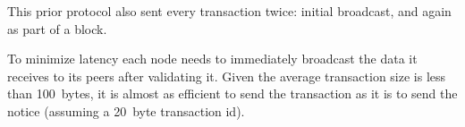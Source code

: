 This prior protocol also sent every transaction twice: initial broadcast, and
again as part of a block. 

To minimize latency each node needs to immediately broadcast the data it
receives to its peers after validating it. Given the average transaction size
is less than \SI{100}{bytes}, it is almost as efficient to send the transaction
as it is to send the notice (assuming a \SI{20}{byte} transaction id).

% 
% 
% 
% 
